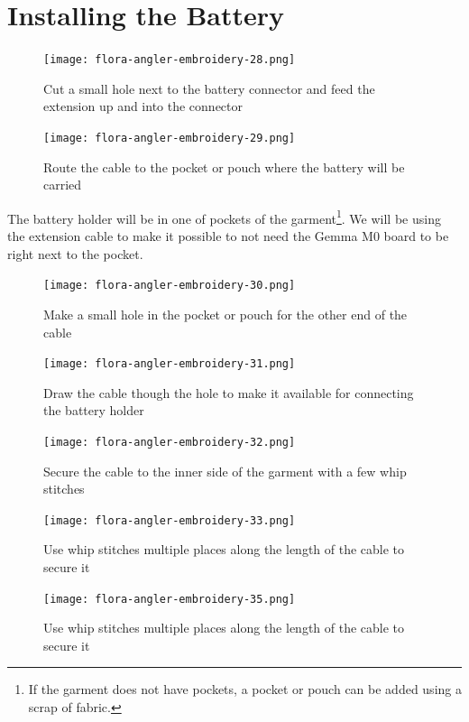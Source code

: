 \documentclass[letterpaper,twoside,12pt]{article}
\begin{document}
\part{Installing the Battery}
\begin{figure}[hbpt]\begin{centering}%
\texttt{[image: flora-angler-embroidery-28.png]}
\caption{Cut a small hole next to the battery connector and feed the extension 
up and into the connector}
\label{fig:flora-angler-embroidery-28}
\end{centering}\end{figure}
\begin{figure}[hbpt]\begin{centering}%
\texttt{[image: flora-angler-embroidery-29.png]}
\caption{Route the cable to the pocket or pouch where the battery will be carried}
\label{fig:flora-angler-embroidery-29}
\end{centering}\end{figure}
The battery holder will be in one of pockets of the garment\footnote{If the
garment does not have pockets, a pocket or pouch can be added using a scrap of
fabric.}. We will be using the extension cable to make it possible to not need 
the Gemma M0 board to be right next to the pocket.
\begin{figure}[hbpt]\begin{centering}%
\texttt{[image: flora-angler-embroidery-30.png]}
\caption{Make a small hole in the pocket or pouch for the other end of the cable}
\label{fig:flora-angler-embroidery-30}
\end{centering}\end{figure}
\begin{figure}[hbpt]\begin{centering}%
\texttt{[image: flora-angler-embroidery-31.png]}
\caption{Draw the cable though the hole to make it available for connecting 
the battery holder}
\label{fig:flora-angler-embroidery-31}
\end{centering}\end{figure}
\begin{figure}[hbpt]\begin{centering}%
\texttt{[image: flora-angler-embroidery-32.png]}
\caption{Secure the cable to the inner side of the garment with a few whip stitches}
\label{fig:flora-angler-embroidery-32}
\end{centering}\end{figure}
\begin{figure}[hbpt]\begin{centering}%
\texttt{[image: flora-angler-embroidery-33.png]}
\caption{Use whip stitches multiple places along the length of the cable to 
secure it}
\label{fig:flora-angler-embroidery-33}
\end{centering}\end{figure}
\begin{figure}[hbpt]\begin{centering}%
\texttt{[image: flora-angler-embroidery-35.png]}
\caption{Use whip stitches multiple places along the length of the cable to 
secure it}
\label{fig:flora-angler-embroidery-35}
\end{centering}\end{figure}
\end{document}
